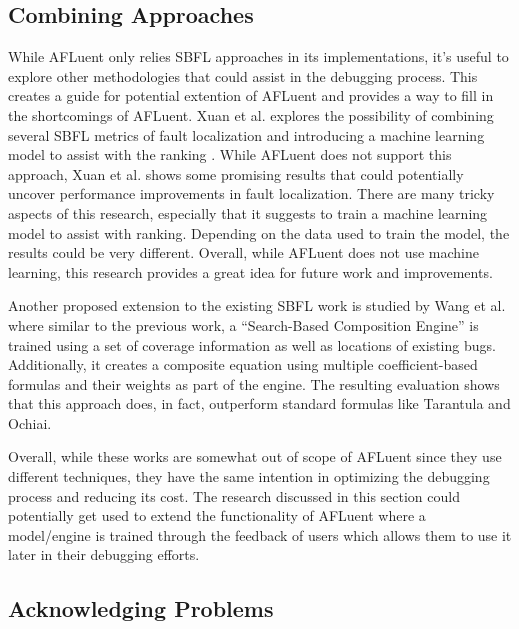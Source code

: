 \subsection{Combining Approaches}
\label{subsec:combining_approaches}

While AFLuent only relies SBFL approaches in its implementations, it's
useful to explore other methodologies that could assist in the debugging
process. This creates a guide for potential extention of AFLuent and
provides a way to fill in the shortcomings of AFLuent. Xuan et al. explores the
possibility of combining several SBFL metrics of fault localization and
introducing a machine learning model to assist with the ranking
\cite{Xuan2014Combine}. While AFLuent does not support this approach, Xuan et
al. shows some promising results that could potentially uncover performance
improvements in fault localization. There are many tricky aspects of this
research, especially that it suggests to train a machine learning model to
assist with ranking. Depending on the data used to train the model, the results
could be very different. Overall, while AFLuent does not use machine learning,
this research provides a great idea for future work and improvements.

Another proposed extension to the existing SBFL work is studied by Wang et al.
\cite{Wang2011Search} where similar to the previous work, a ``Search-Based
Composition Engine'' is trained using a set of coverage information as well as
locations of existing bugs. Additionally, it creates a composite equation using
multiple coefficient-based formulas and their weights as part of the engine. The
resulting evaluation shows that this approach does, in fact, outperform standard
formulas like Tarantula and Ochiai.

Overall, while these works are somewhat out of scope of AFLuent since they use
different techniques, they have the same intention in optimizing the debugging
process and reducing its cost. The research discussed in this section could
potentially get used to extend the functionality of AFLuent where a model/engine
is trained through the feedback of users which allows them to use it later in
their debugging efforts.

\subsection{Acknowledging Problems}
\label{subsec:acknowledging_problems}

